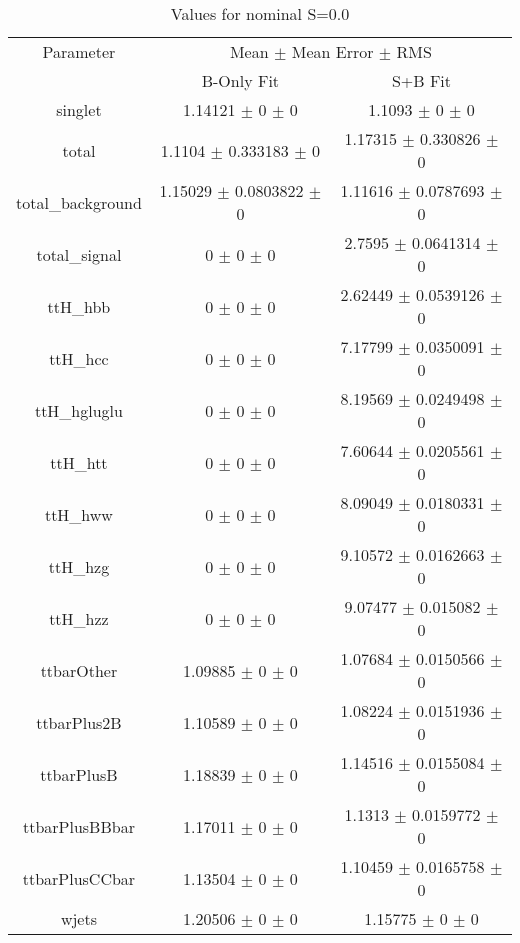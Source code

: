 \begin{table}
\centering
\caption{Values for nominal S=0.0}
\begin{tabular}{ccc}
\toprule
Parameter & \multicolumn{2}{c}{Mean $\pm$ Mean Error $\pm$ RMS}\\
 & B-Only Fit & S+B Fit\\
\midrule
singlet & \num{1.14121} $\pm$ \num{0} $\pm$ \num{0} & \num{1.1093} $\pm$ \num{0} $\pm$ \num{0}\\
total & \num{1.1104} $\pm$ \num{0.333183} $\pm$ \num{0} & \num{1.17315} $\pm$ \num{0.330826} $\pm$ \num{0}\\
total\_background & \num{1.15029} $\pm$ \num{0.0803822} $\pm$ \num{0} & \num{1.11616} $\pm$ \num{0.0787693} $\pm$ \num{0}\\
total\_signal & \num{0} $\pm$ \num{0} $\pm$ \num{0} & \num{2.7595} $\pm$ \num{0.0641314} $\pm$ \num{0}\\
ttH\_hbb & \num{0} $\pm$ \num{0} $\pm$ \num{0} & \num{2.62449} $\pm$ \num{0.0539126} $\pm$ \num{0}\\
ttH\_hcc & \num{0} $\pm$ \num{0} $\pm$ \num{0} & \num{7.17799} $\pm$ \num{0.0350091} $\pm$ \num{0}\\
ttH\_hgluglu & \num{0} $\pm$ \num{0} $\pm$ \num{0} & \num{8.19569} $\pm$ \num{0.0249498} $\pm$ \num{0}\\
ttH\_htt & \num{0} $\pm$ \num{0} $\pm$ \num{0} & \num{7.60644} $\pm$ \num{0.0205561} $\pm$ \num{0}\\
ttH\_hww & \num{0} $\pm$ \num{0} $\pm$ \num{0} & \num{8.09049} $\pm$ \num{0.0180331} $\pm$ \num{0}\\
ttH\_hzg & \num{0} $\pm$ \num{0} $\pm$ \num{0} & \num{9.10572} $\pm$ \num{0.0162663} $\pm$ \num{0}\\
ttH\_hzz & \num{0} $\pm$ \num{0} $\pm$ \num{0} & \num{9.07477} $\pm$ \num{0.015082} $\pm$ \num{0}\\
ttbarOther & \num{1.09885} $\pm$ \num{0} $\pm$ \num{0} & \num{1.07684} $\pm$ \num{0.0150566} $\pm$ \num{0}\\
ttbarPlus2B & \num{1.10589} $\pm$ \num{0} $\pm$ \num{0} & \num{1.08224} $\pm$ \num{0.0151936} $\pm$ \num{0}\\
ttbarPlusB & \num{1.18839} $\pm$ \num{0} $\pm$ \num{0} & \num{1.14516} $\pm$ \num{0.0155084} $\pm$ \num{0}\\
ttbarPlusBBbar & \num{1.17011} $\pm$ \num{0} $\pm$ \num{0} & \num{1.1313} $\pm$ \num{0.0159772} $\pm$ \num{0}\\
ttbarPlusCCbar & \num{1.13504} $\pm$ \num{0} $\pm$ \num{0} & \num{1.10459} $\pm$ \num{0.0165758} $\pm$ \num{0}\\
wjets & \num{1.20506} $\pm$ \num{0} $\pm$ \num{0} & \num{1.15775} $\pm$ \num{0} $\pm$ \num{0}\\
\bottomrule
\end{tabular}
\end{table}